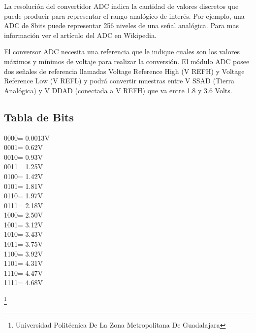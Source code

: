 \documentclass[10pt,a4paper]{article}
\begin{document}
La resolución del convertidor ADC indica la cantidad de valores discretos que puede producir para representar el rango analógico de interés. Por ejemplo, una ADC de 8bits puede representar 256 niveles de una señal analógica. Para mas información ver el artículo del ADC en Wikipedia.

El conversor ADC necesita una referencia que le indique cuales son los valores máximos y mínimos de voltaje para realizar la conversión. El módulo ADC posee dos señales de referencia llamadas Voltage Reference High (V REFH) y Voltage Reference Low (V REFL) y podrá convertir muestras entre V SSAD (Tierra Analógica) y V DDAD (conectada a V REFH) que va entre 1.8 y 3.6 Volts. 
\subsection{Tabla de Bits}
0000= 0.0013V\\
0001= 0.62V\\
0010= 0.93V\\
0011= 1.25V\\
0100= 1.42V\\
0101= 1.81V\\
0110= 1.97V\\
0111= 2.18V\\
1000= 2.50V\\
1001= 3.12V\\
1010= 3.43V\\
1011= 3.75V\\
1100= 3.92V\\
1101= 4.31V\\
1110= 4.47V\\
1111= 4.68V

\footnote{Universidad Politécnica De La Zona Metropolitana De Guadalajara} 

\newpage
\end{document}

